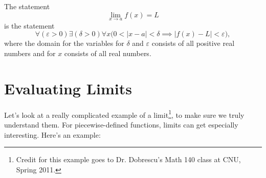 The statement
\[ \lim_{x \to a} f(x) = L \]
is the statement
\begin{equation}
  \forall (\varepsilon > 0) \exists (\delta>0) \forall x \Big(0 < | x -a| < \delta \implies
  \big|f(x)-L\big| < \varepsilon\Big),
  \label{eq:e_d_limit}
\end{equation}
where the domain for the variables for $\delta$ and $\varepsilon$ consists of
all positive real numbers and for $x$ consists of all real
numbers.

\section{Evaluating Limits}

Let's look at a really complicated example of a limit\footnote{Credit for this example goes to Dr. Dobrescu's Math 140 class at CNU, Spring 2011.}, to make sure we truly understand them.
For piecewise-defined functions, limits can get especially interesting. Here's an example:

